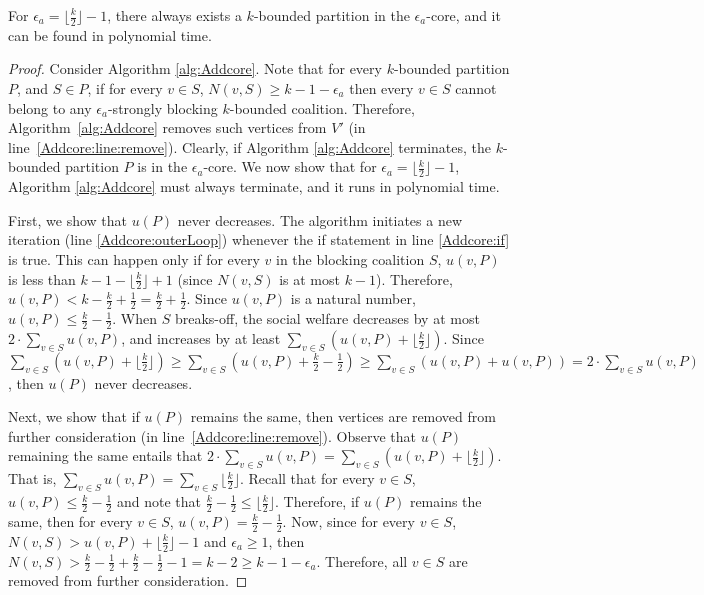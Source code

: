 \documentclass[sigconf,anonymous]{aamas}
\begin{document}
\begin{theorem}
For $\epsilon_a = \lfloor \frac{k}{2} \rfloor -1$, there always exists a $k$-bounded partition in the $\epsilon_a$-core, and it can be found in polynomial time.
\end{theorem}

\begin{proof}
Consider Algorithm \ref{alg:Addcore}.
Note that for every $k$-bounded partition $P$, and $S \in P$, if for every $v \in S$, $N(v ,S) \geq k-1-\epsilon_a$ then every $v \in S$ cannot belong to any $\epsilon_a$-strongly blocking $k$-bounded coalition.
Therefore, Algorithm~\ref{alg:Addcore} removes such vertices from $V'$ (in line~\ref{Addcore:line:remove}).
Clearly, if Algorithm \ref{alg:Addcore} terminates, the $k$-bounded partition $P$ is in the $\epsilon_a$-core.
We now show that for $\epsilon_a = \lfloor \frac{k}{2} \rfloor -1$, Algorithm \ref{alg:Addcore} must always terminate, and it runs in polynomial time.

First, we show that $u(P)$ never decreases.
The algorithm initiates a new iteration (line  \ref{Addcore:outerLoop}) whenever the if statement in line \ref{Addcore:if} is true. This can happen only if for every $v$ in the blocking coalition $S$, $u(v,P)$ is less than $k-1-\lfloor \frac{k}{2} \rfloor + 1$ (since $N(v ,S)$ is at most $k-1$). Therefore, $u(v,P) < k-\frac{k}{2}+\frac{1}{2} = \frac{k}{2}+\frac{1}{2}$.
Since $u(v,P)$ is a natural number, $u(v,P) \leq \frac{k}{2}-\frac{1}{2}$.
When $S$ breaks-off, the social welfare decreases by at most $2 \cdot \sum\limits_{v\in S} u(v,P)$, and increases by at least $\sum\limits_{v\in S} (u(v,P)+\lfloor \frac{k}{2} \rfloor)$.
Since $\sum\limits_{v\in S} (u(v,P)+\lfloor \frac{k}{2} \rfloor) \geq \sum\limits_{v\in S} (u(v,P)+ \frac{k}{2} - \frac{1}{2}) \geq \sum\limits_{v\in S} (u(v,P)+ u(v,P)) = 2 \cdot \sum\limits_{v\in S} u(v,P)$, then $u(P)$ never decreases.

Next, we show that if $u(P)$ remains the same, then vertices are removed from further consideration (in line~\ref{Addcore:line:remove}). Observe that $u(P)$ remaining the same entails that $2 \cdot \sum\limits_{v\in S} u(v,P) = \sum\limits_{v\in S} (u(v,P)+\lfloor \frac{k}{2} \rfloor)$.
That is, $\sum\limits_{v\in S} u(v,P) = \sum\limits_{v\in S} \lfloor \frac{k}{2} \rfloor$. Recall that for every $v \in S$, $u(v,P) \leq \frac{k}{2}-\frac{1}{2}$ and note that $\frac{k}{2}-\frac{1}{2} \leq \lfloor \frac{k}{2} \rfloor$. Therefore, if $u(P)$ remains the same, then for every $v \in S$, $u(v,P) = \frac{k}{2}-\frac{1}{2}$. %
Now, since for every $v \in S$,  $N(v,S) > u(v,P) + \lfloor \frac{k}{2} \rfloor -1$ and $\epsilon_a \geq 1$, then $N(v,S) > \frac{k}{2} - \frac{1}{2} + \frac{k}{2} - \frac{1}{2} - 1 = k-2 \geq k-1-\epsilon_a$.
Therefore, all $v \in S$ are removed from further consideration. 


\end{proof}
\end{document}
